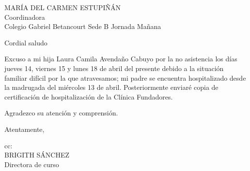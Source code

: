 \documentclass[letterpaper,spanish,11pt]{letter}
\begin{document}
\date{19 de abril de 2016}
\begin{letter}{MARÍA DEL CARMEN ESTUPIÑÁN\\Coordinadora\\Colegio Gabriel Betancourt Sede B Jornada Mañana}
	
\opening{Cordial saludo}
Excuso a mi hija Laura Camila Avendaño Cabuyo por la no asistencia los días jueves 14, viernes 15 y lunes 18 de abril del presente debido a la situación familiar difícil por la que atravesamos; mi padre se encuentra hospitalizado desde la madrugada del miércoles 13 de abril. Posteriormente enviaré copia de certificación de hospitalización de la Clínica Fundadores.

Agradezco su atención y comprensión.
\closing{Atentamente,}

cc{:\\BRIGITH SÁNCHEZ\\
Directora de curso}

\end{letter}
\end{document}

